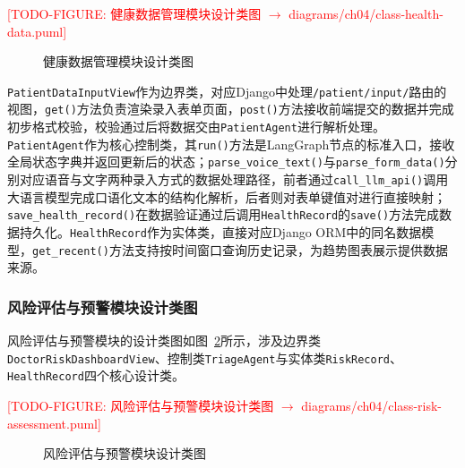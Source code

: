 \todofig{}
\textcolor{red}{[TODO-FIGURE: 健康数据管理模块设计类图 $\rightarrow$ diagrams/ch04/class-health-data.puml]}
\begin{figure}[H]
\centering
\caption{健康数据管理模块设计类图}
\label{fig:class-health-data}
\end{figure}

\texttt{PatientDataInputView}作为边界类，对应Django中处理\texttt{/patient/input/}路由的视图，\texttt{get()}方法负责渲染录入表单页面，\texttt{post()}方法接收前端提交的数据并完成初步格式校验，校验通过后将数据交由\texttt{PatientAgent}进行解析处理。\texttt{PatientAgent}作为核心控制类，其\texttt{run()}方法是LangGraph节点的标准入口，接收全局状态字典并返回更新后的状态；\texttt{parse\_voice\_text()}与\texttt{parse\_form\_data()}分别对应语音与文字两种录入方式的数据处理路径，前者通过\texttt{call\_llm\_api()}调用大语言模型完成口语化文本的结构化解析，后者则对表单键值对进行直接映射；\texttt{save\_health\_record()}在数据验证通过后调用\texttt{HealthRecord}的\texttt{save()}方法完成数据持久化。\texttt{HealthRecord}作为实体类，直接对应Django ORM中的同名数据模型，\texttt{get\_recent()}方法支持按时间窗口查询历史记录，为趋势图表展示提供数据来源。


\subsubsection{风险评估与预警模块设计类图}

风险评估与预警模块的设计类图如图~\ref{fig:class-risk-assessment}所示，涉及边界类\texttt{DoctorRiskDashboardView}、控制类\texttt{TriageAgent}与实体类\texttt{RiskRecord}、\texttt{HealthRecord}四个核心设计类。

\todofig{}
\textcolor{red}{[TODO-FIGURE: 风险评估与预警模块设计类图 $\rightarrow$ diagrams/ch04/class-risk-assessment.puml]}
\begin{figure}[H]
\centering
\caption{风险评估与预警模块设计类图}
\label{fig:class-risk-assessment}
\end{figure}

